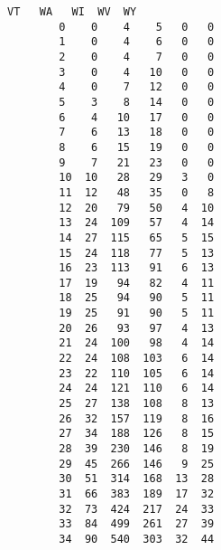 \documentclass[11pt]{article}
\begin{document}
\begin{Verbatim}[commandchars=\\\{\}]
            VT   WA   WI  WV  WY  
        0    0    4    5   0   0  
        1    0    4    6   0   0  
        2    0    4    7   0   0  
        3    0    4   10   0   0  
        4    0    7   12   0   0  
        5    3    8   14   0   0  
        6    4   10   17   0   0  
        7    6   13   18   0   0  
        8    6   15   19   0   0  
        9    7   21   23   0   0  
        10  10   28   29   3   0  
        11  12   48   35   0   8  
        12  20   79   50   4  10  
        13  24  109   57   4  14  
        14  27  115   65   5  15  
        15  24  118   77   5  13  
        16  23  113   91   6  13  
        17  19   94   82   4  11  
        18  25   94   90   5  11  
        19  25   91   90   5  11  
        20  26   93   97   4  13  
        21  24  100   98   4  14  
        22  24  108  103   6  14  
        23  22  110  105   6  14  
        24  24  121  110   6  14  
        25  27  138  108   8  13  
        26  32  157  119   8  16  
        27  34  188  126   8  15  
        28  39  230  146   8  19  
        29  45  266  146   9  25  
        30  51  314  168  13  28  
        31  66  383  189  17  32  
        32  73  424  217  24  33  
        33  84  499  261  27  39  
        34  90  540  303  32  44  
\end{Verbatim}
            
\end{document}
